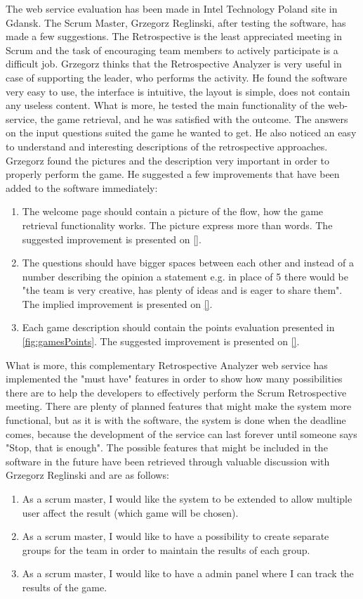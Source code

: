 The web service evaluation has been made in Intel Technology Poland site in Gdansk. The Scrum Master, Grzegorz Reglinski, after testing the software, has made a few suggestions. The Retrospective is the least appreciated meeting in Scrum and the task of encouraging team members to actively participate is a difficult job. Grzegorz thinks that the Retrospective Analyzer is very useful in case of supporting the leader, who performs the activity. He found the software very easy to use, the interface is intuitive, the layout is simple, does not contain any useless content. What is more, he tested the main functionality of the web-service, the game retrieval, and he was satisfied with the outcome. The answers on the input questions suited the game he wanted to get. He also noticed an easy to understand and interesting descriptions of the retrospective approaches. Grzegorz found the pictures and the description very important in order to properly perform the game. He suggested a few improvements that have been added to the software immediately: 
\begin{enumerate}
    \item The welcome page should contain a picture of the flow, how the game retrieval functionality works. The picture express more than words. The suggested improvement is presented on \autoref{}.
    \item The questions should have bigger spaces between each other and instead of a number describing the opinion a statement e.g. in place of 5 there would be "the team is very creative, has plenty of ideas and is eager to share them". The implied improvement is presented on \autoref{}.
    \item Each game description should contain the points evaluation presented in \autoref{fig:gamesPoints}. The suggested improvement is presented on \autoref{}.
\end{enumerate}

What is more, this complementary Retrospective Analyzer web service has implemented the "must have" features in order to show how many possibilities there are to help the developers to effectively perform the Scrum Retrospective meeting. There are plenty of planned features that might make the system more functional, but as it is with the software, the system is done when the deadline comes, because the development of the service can last forever until someone says "Stop, that is enough". The possible features that might be included in the software in the future have been retrieved through valuable discussion with Grzegorz Reglinski and are as follows:
\begin{enumerate}
    \item As a scrum master, I would like the system to be extended to allow multiple user affect the result (which game will be chosen).
    \item As a scrum master, I would like to have a possibility to create separate groups for the team in order to maintain the results of each group.
    \item As a scrum master, I would like to have a admin panel where I can track the results of the game.
\end{enumerate}



